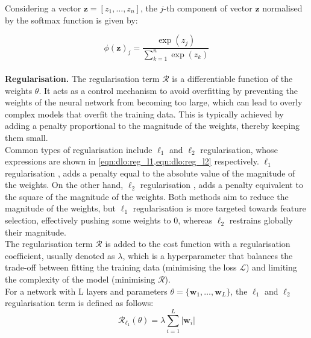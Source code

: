 Considering a vector $\mathbf{z} = [z_1, \dots, z_n]$, the $j$-th component of
vector $\mathbf{z}$ normalised by the softmax function is given by: 

\begin{equation}
  \label{eqn:dlo:softmax}
  \phi(\mathbf{z})_j = \frac{\exp(z_j)}{\displaystyle\sum_{k=1}^{n} \exp(z_k)}
\end{equation}\\

\noindent \textbf{Regularisation.} The regularisation term $\mathcal{R}$ is a
differentiable function of the weights $\theta$. It acts as a control mechanism
to avoid overfitting by preventing the weights of the neural network from
becoming too large, which can lead to overly complex models that overfit the
training data. This is typically achieved by adding a penalty proportional to
the magnitude of the weights, thereby keeping them small.\\

Common types of regularisation include $\ell_1$ and $\ell_2$ regularisation,
whose expressions are shown in \cref{eqn:dlo:reg_l1,eqn:dlo:reg_l2}
respectively. $\ell_1$ regularisation \cite{tibshirani1996regression}, adds a
penalty equal to the absolute value of the magnitude of the weights. On the
other hand, $\ell_2$ regularisation \cite{hoerl1970ridge}, adds a penalty
equivalent to the square of the magnitude of the weights. Both methods aim to
reduce the magnitude of the weights, but $\ell_1$ regularisation is more
targeted towards feature selection, effectively pushing some weights to $0$,
whereas $\ell_2$ restrains globally their magnitude.\\

The regularisation term $\mathcal{R}$ is added to the cost function with a
regularisation coefficient, usually denoted as $\lambda$, which is a
hyperparameter that balances the trade-off between fitting the training data
(minimising the loss $\mathcal{L}$) and limiting the complexity of the model
(minimising $\mathcal{R}$).\\

For a network with L layers and parameters $\theta=\{\mathbf{w}_1, \dots,
\mathbf{w}_L\}$, the $\ell_1$ and $\ell_2$ regularisation term is defined as
follows:\\

\begin{equation}
  \label{eqn:dlo:reg_l1}
  \mathcal{R}_{\ell_1}(\theta) = \lambda \sum_{i=1}^{L} \left| \mathbf{w}_i \right|
\end{equation}\\


